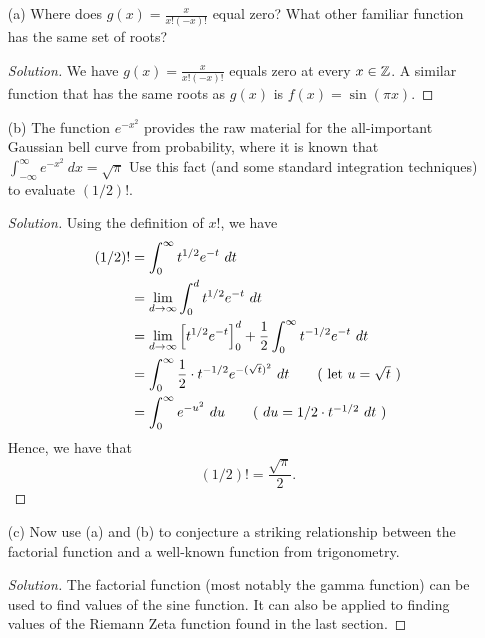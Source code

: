 \begin{enumerate}
    \item[(a)] Where does \( g(x)  = \frac{ x }{ x! (-x)! }  \) equal zero? What other familiar function has the same set of roots? 
        \begin{proof}[Solution]
        We have \( g(x) = \frac{ x }{ x! (-x)! }  \) equals zero at every \(  x \in \mathbb{Z}  \). A similar function that has the same roots as \( g(x)  \) is \( f(x) = \sin(\pi x) \). 
        \end{proof}
    \item[(b)] The function \( e^{-x ^{2}}  \) provides the raw material for the all-important Gaussian bell curve from probability, where it is known that \( \int_{ -\infty  }^{ \infty  }  e^{-x ^{2}} \ dx = \sqrt{ \pi  }   \) Use this fact (and some standard integration techniques) to evaluate \( (1/2)! \).
        \begin{proof}[Solution]
        Using the definition of \( x!  \), we have 
        \begin{align*}
            ( 1/2  )! &= \int_{ 0 }^{ \infty  } t^{1/2} e^{-t } \ dt \\
                                          &= \lim_{ d \to \infty  } \int_{ 0 }^{ d } t^{1/2} e^{-t} \  dt \\
                                          &= \lim_{ d \to \infty  }  \Big[ t^{ 1/2} e^{-t } \Big]_{0}^{d} + \frac{ 1 }{ 2 }  \int_{ 0 }^{ \infty  } t^{-1/2} e^{-t} \ dt \\
                                          &= \int_{ 0 }^{ \infty  } \frac{ 1 }{ 2 }  \cdot t^{-1/2} e^{- (\sqrt{ t } )^{2}} \ dt  \tag{  \text{let \( u = \sqrt{ t }    \)} }  \\
                                          &= \int_{ 0 }^{ \infty  } e^{-u^{2}} \ du \tag{ \( du = 1 /2 \cdot  t^{-1/2} \ dt  \) } \\
        \end{align*}
        Hence, we have that 
        \[  (1/2)! = \frac{ \sqrt{ \pi  }  }{ 2  }. \]
        \end{proof}
    \item[(c)] Now use (a) and (b) to conjecture a striking relationship between the factorial function and a well-known function from trigonometry. 
       \begin{proof}[Solution]
       The factorial function (most notably the gamma function) can be used to find values of the sine function. It can also be applied to finding values of the Riemann Zeta function found in the last section.
       \end{proof} 
\end{enumerate}

